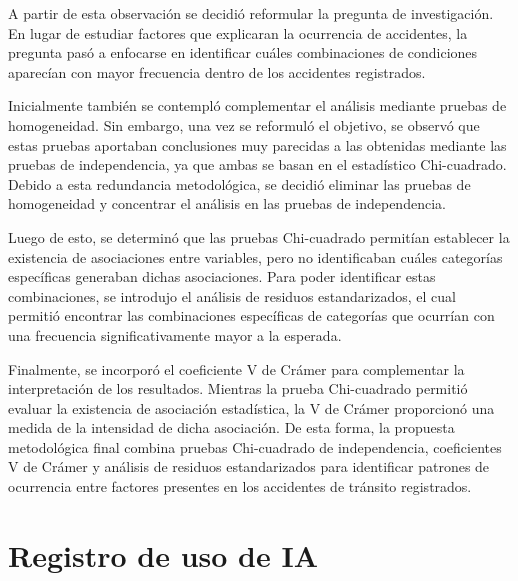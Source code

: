 \documentclass[12pt]{article}
\begin{document}
A partir de esta observación se decidió reformular la pregunta de investigación. En lugar de 
estudiar factores que explicaran la ocurrencia de accidentes, la pregunta pasó a enfocarse en 
identificar cuáles combinaciones de condiciones aparecían con mayor frecuencia dentro de los 
accidentes registrados. 

Inicialmente también se contempló complementar el análisis mediante pruebas de homogeneidad. 
Sin embargo, una vez se reformuló el objetivo, se observó que estas pruebas aportaban conclusiones 
muy parecidas a las obtenidas mediante las pruebas de independencia, ya que ambas se basan en 
el estadístico Chi-cuadrado. Debido a esta redundancia metodológica, se decidió eliminar las 
pruebas de homogeneidad y concentrar el análisis en las pruebas de independencia.

Luego de esto, se determinó que las pruebas Chi-cuadrado permitían establecer la existencia de 
asociaciones entre variables, pero no identificaban cuáles categorías específicas generaban dichas 
asociaciones. Para poder identificar estas combinaciones, se introdujo el análisis de residuos estandarizados, 
el cual permitió encontrar las combinaciones específicas de categorías que ocurrían con una 
frecuencia significativamente mayor a la esperada.

Finalmente, se incorporó el coeficiente V de Crámer para complementar la interpretación de los 
resultados. Mientras la prueba Chi-cuadrado permitió evaluar la existencia de asociación estadística, 
la V de Crámer proporcionó una medida de la intensidad de dicha asociación. De esta forma, la 
propuesta metodológica final combina pruebas Chi-cuadrado de independencia, coeficientes V de Crámer 
y análisis de residuos estandarizados para identificar patrones de ocurrencia entre factores 
presentes en los accidentes de tránsito registrados.

\section{Registro de uso de IA}
\end{document}
